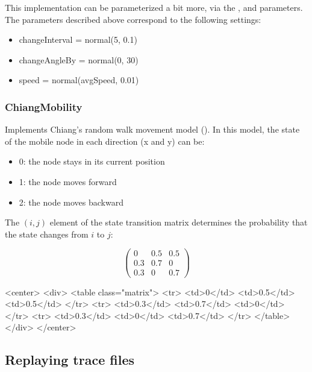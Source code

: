 This implementation can be parameterized a bit more, via the
,  and  parameters.
The parameters described above correspond to the following settings:

\begin{itemize}
\item changeInterval = normal(5, 0.1)
\item changeAngleBy = normal(0, 30)
\item speed = normal(avgSpeed, 0.01)
\end{itemize}

\subsubsection*{ChiangMobility}

Implements Chiang's random walk movement model (\cite{Chiang98wirelessnetwork}).
In this model, the state of the mobile node in each direction (x and y) can be:

\begin{itemize}
  \item 0: the node stays in its current position
  \item 1: the node moves forward
  \item 2: the node moves backward
\end{itemize}

The $(i,j)$ element of the state transition matrix determines the
probability that the state changes from $i$ to $j$:

\begin{pdfonly}
$$ \left(
\begin{array}{ccc}
  0 & 0.5 & 0.5 \\
  0.3 & 0.7 & 0 \\
  0.3 & 0 & 0.7
\end{array}
\right) $$
\end{pdfonly}

\begin{htmlonly}
<center>
<div>
<table class="matrix">
  <tr> <td>0</td>   <td>0.5</td> <td>0.5</td> </tr>
  <tr> <td>0.3</td> <td>0.7</td> <td>0</td>   </tr>
  <tr> <td>0.3</td> <td>0</td>   <td>0.7</td> </tr>
</table>
</div>
</center>
\end{htmlonly}

\subsection{Replaying trace files}
\label{sec:mobility:replaying-trace-files}

